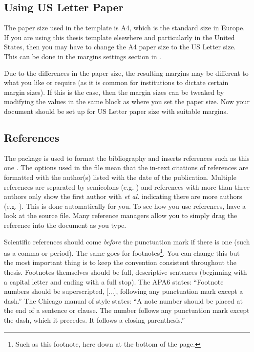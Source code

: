 \subsection{Using US Letter Paper}

The paper size used in the template is A4, which is the standard size in Europe. If you are using this thesis template elsewhere and particularly in the United States, then you may have to change the A4 paper size to the US Letter size. This can be done in the margins settings section in .

Due to the differences in the paper size, the resulting margins may be different to what you like or require (as it is common for institutions to dictate certain margin sizes). If this is the case, then the margin sizes can be tweaked by modifying the values in the same block as where you set the paper size. Now your document should be set up for US Letter paper size with suitable margins.

\subsection{References}

The  package is used to format the bibliography and inserts references such as this one \cite{Reference1}. The options used in the  file mean that the in-text citations of references are formatted with the author(s) listed with the date of the publication. Multiple references are separated by semicolons (e.g. \cite{Reference2, Reference1}) and references with more than three authors only show the first author with \emph{et al.} indicating there are more authors (e.g. \cite{Reference3}). This is done automatically for you. To see how you use references, have a look at the  source file. Many reference managers allow you to simply drag the reference into the document as you type.

Scientific references should come \emph{before} the punctuation mark if there is one (such as a comma or period). The same goes for footnotes\footnote{Such as this footnote, here down at the bottom of the page.}. You can change this but the most important thing is to keep the convention consistent throughout the thesis. Footnotes themselves should be full, descriptive sentences (beginning with a capital letter and ending with a full stop). The APA6 states: \enquote{Footnote numbers should be superscripted, [...], following any punctuation mark except a dash.} The Chicago manual of style states: \enquote{A note number should be placed at the end of a sentence or clause. The number follows any punctuation mark except the dash, which it precedes. It follows a closing parenthesis.}

